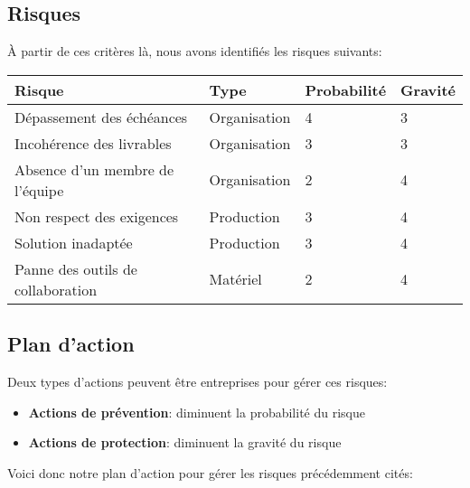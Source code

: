 \newpage

\subsection*{Risques}

À partir de ces critères là, nous avons identifiés les risques suivants:

\begin{tabular}{|l||l|l|l|}
   \hline	
	   \textbf{Risque} & \textbf{Type} & \textbf{Probabilité} & \textbf{Gravité} \\ \hline \hline
	   Dépassement des échéances         & Organisation & 4 & 3  \\ \hline
	   Incohérence des livrables         & Organisation & 3 & 3  \\ \hline
  	 Absence d'un membre de l'équipe   & Organisation & 2 & 4  \\ \hline
	   Non respect des exigences         & Production   & 3 & 4  \\ \hline
	   Solution inadaptée                & Production   & 3 & 4  \\ \hline
	   Panne des outils de collaboration & Matériel     & 2 & 4  \\
   \hline
\end{tabular}

\subsection*{Plan d'action}

Deux types d'actions peuvent être entreprises pour gérer ces risques:

\begin{itemize}
  \item \textbf{Actions de prévention}: diminuent la probabilité du risque
  \item \textbf{Actions de protection}: diminuent la gravité du risque
\end{itemize}

Voici donc notre plan d'action pour gérer les risques précédemment cités:


